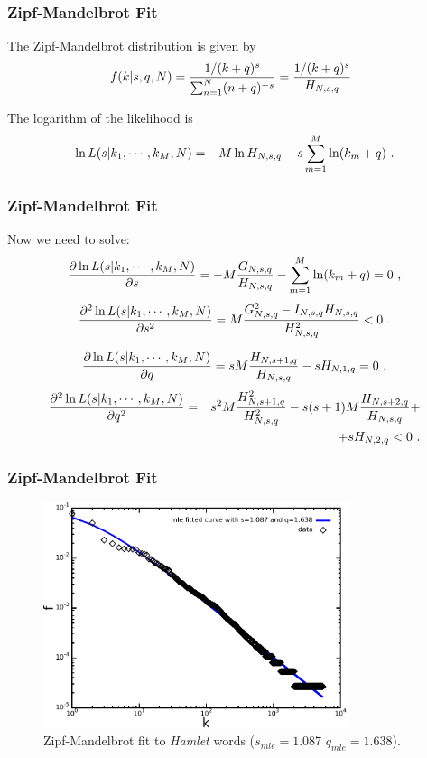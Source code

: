 \documentclass[notes]{beamer}
\begin{document}
\frame
{
  \frametitle{Zipf-Mandelbrot Fit}

The Zipf-Mandelbrot distribution is given by
\begin{equation}
f(k | s, q, N) = \frac{1/(k+q)^s}{\sum_{n=1}^{N} (n+q)^{-s} } = \frac{1/(k+q)^s}{H_{N,s,q}} \textmd{ .} 
\end{equation}

The logarithm of the likelihood is
\begin{equation}
\ln L(s|k_1,\cdots,k_M,N) = -M \ln H_{N,s,q} - s \sum_{m=1}^{M} \ln (k_m+q) \textmd{ .} 
\end{equation}
}


\frame
{
  \frametitle{Zipf-Mandelbrot Fit}
  Now we need to solve:
  \begin{equation}
  \frac{\partial \ln L(s|k_1,\cdots,k_M,N)}{\partial s} = -M \frac{G_{N,s,q}}{H_{N,s,q}} - \sum_{m=1}^{M} \ln (k_m + q) = 0 \textmd{ ,}
  \end{equation}
  \begin{equation}
  \frac{\partial^2 \ln L(s|k_1,\cdots,k_M,N)}{\partial s^2} = M \frac{G_{N,s,q}^2 - I_{N,s,q} H_{N,s,q}}{H_{N,s,q}^2} < 0  \textmd{ .}
  \end{equation}

  \begin{equation}
  \frac{\partial \ln L(s|k_1,\cdots,k_M,N)}{\partial q} = sM \frac{H_{N,s+1,q}}{H_{N,s,q}} - s H_{N,1,q} = 0 \textmd{ ,}
  \end{equation}
  \begin{eqnarray}
  \frac{\partial^2 \ln L(s|k_1,\cdots,k_M,N)}{\partial q^2} &=& s^2 M \frac{H_{N,s+1,q}^2}{H_{N,s,q}^2} - s(s+1)M \frac{H_{N,s+2,q}}{H_{N,s,q}} + \nonumber \\ && + s H_{N,2,q} < 0 \textmd{ .}
  \end{eqnarray}
}


\frame
{
  \frametitle{Zipf-Mandelbrot Fit}
  \vspace{-0.3cm}
  \begin{figure}[h]
  \centering
  \includegraphics[width=0.8\textwidth]{imagespresentation/shakespeare-hamlet.pdf}
  \caption{Zipf-Mandelbrot fit to \emph{Hamlet} words ($s_{mle}=1.087$ $q_{mle}=1.638$).}
  \end{figure}
}
\end{document}
